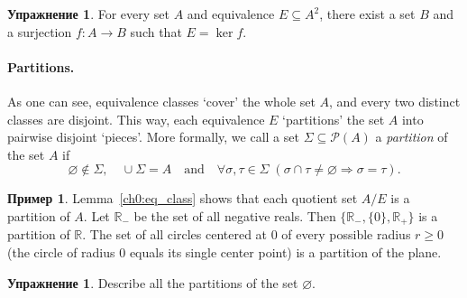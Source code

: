 \documentclass[12pt,notitlepage]{article}
\theoremstyle{plain}
\theoremstyle{definition}
\newtheorem{exc}[thm]{Упражнение}
\newtheorem{exm}[thm]{Пример}
\newtheorem{rem}[thm]{Замечание}
\theoremstyle{plain}
\newcommand{\R}{\mathbb{R}}
\newcommand{\sbs}{\subseteq}
\newcommand{\void}{\varnothing}
\newcommand{\mP}{\mathcal{P}}
\newcommand{\1}{\mathbf{1}}
\newcommand{\0}{\mathbf{0}}
\newcommand{\ply}{\Longrightarrow}
\begin{document}
\begin{exc}
	For every set $A$ and equivalence $E \sbs A^2$, there exist a set $B$ and a surjection $f\colon A \to B$ such that $E = \ker f$.
\end{exc}


\paragraph{Partitions.}
As one can see, equivalence classes `cover' the whole set $A$, and every two distinct classes are disjoint. This way, each equivalence $E$ `partitions' the set $A$ into pairwise disjoint `pieces'. More formally, we call a set $\Sigma \sbs \mP(A)$ a \emph{partition} of the set $A$ if
$$\void \notin \Sigma, \quad \cup \Sigma = A\quad\mbox{and}\quad \forall \sigma, \tau \in \Sigma\; (\sigma \cap \tau \neq \void \ply \sigma = \tau).$$
\begin{exm}
	Lemma~\ref{ch0:eq_class} shows that each quotient set $A / E$ is a partition of $A$. Let $\R_{-}$ be the set of all negative reals. Then $\{\R_{-}, \{0\}, \R_{+}\}$ is a partition of $\R$. The set of all circles centered at $0$ of every possible radius $r \geq 0$ (the circle of radius $0$ equals its single center point) is a partition of the plane.
\end{exm}
\begin{exc}\label{L13:ex_part_empty}
	Describe all the partitions of the set $\void$.
\end{exc}
\end{document}
